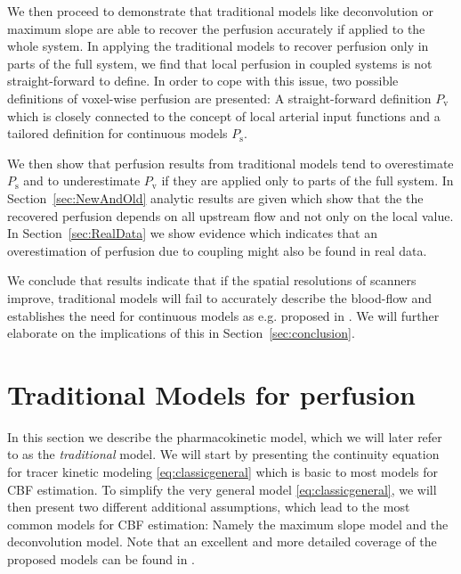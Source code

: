 \documentclass[journal,twocolumn]{IEEEtran}
\newcommand{\Perfv}{P_{\mathrm{v}}}
\newcommand{\Perfs}{P_{\mathrm{s}}}
\begin{document}
	We then proceed to demonstrate that traditional models like deconvolution or maximum slope are able to recover the perfusion accurately if applied to the whole system.
	In applying the traditional models to recover perfusion only in parts of the full system, we find that local perfusion in coupled systems is not straight-forward to define.
	In order to cope with this issue, two possible definitions of voxel-wise perfusion are presented: A straight-forward definition $\Perfv$ which is closely connected to the concept of local arterial input functions and a tailored definition for continuous models $\Perfs$.
	
	We then show that perfusion results from traditional models tend to overestimate $\Perfs$ and to underestimate $\Perfv$ if they are applied only to parts of the full system.
	In Section~\ref{sec:NewAndOld} analytic results are given which show that the the recovered perfusion depends on all upstream flow and not only on the local value.
	In Section~\ref{sec:RealData} we show evidence which indicates that an overestimation of perfusion due to coupling might also be found in real data.
	
	We conclude that results indicate that if the spatial resolutions of scanners improve, traditional models will fail to accurately describe the blood-flow and establishes the need for continuous models as e.g. proposed in \cite{sourbron13}.
	We will further elaborate on the implications of this in Section~\ref{sec:conclusion}.
	
	
	\section{Traditional Models for perfusion} \label{sec:traditional}

	In this section we describe the pharmacokinetic model, which we will later refer to as the \emph{traditional} model.
	We will start by presenting the continuity equation for tracer kinetic modeling \eqref{eq:classicgeneral} which is basic to most models for CBF estimation.
	To simplify the very general model \eqref{eq:classicgeneral}, we will then present two different additional assumptions, which lead to the most common models for CBF estimation: Namely the maximum slope model and the deconvolution model.
	Note that an excellent and more detailed coverage of the proposed models can be found in \cite{sourbron13,klotz99}.
	
\end{document}
